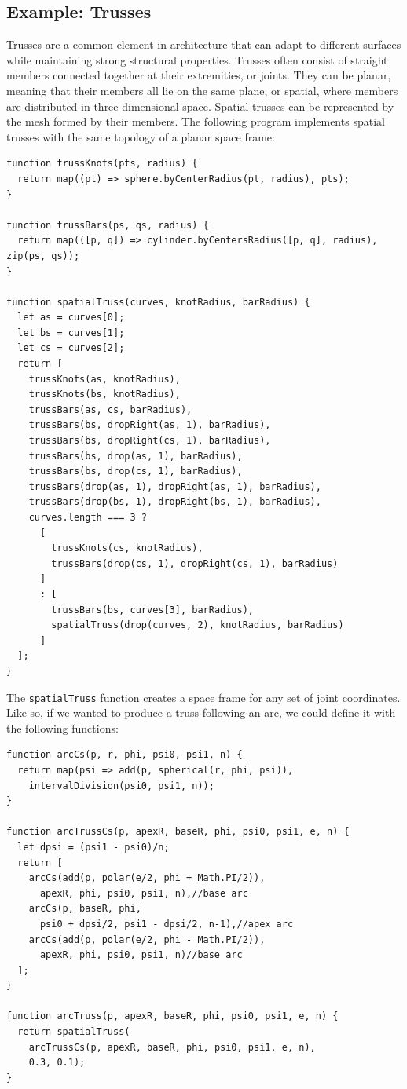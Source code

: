 \subsection{Example: Trusses}
Trusses are a common element in architecture that can adapt to different surfaces while maintaining strong structural properties.
Trusses often consist of straight members connected together at their extremities, or joints.
They can be planar, meaning that their members all lie on the same plane, or spatial, where members are distributed in three dimensional space.
Spatial trusses can be represented by the mesh formed by their members.
The following program implements spatial trusses with the same topology of a planar space frame:

\begin{verbatim}
function trussKnots(pts, radius) {
  return map((pt) => sphere.byCenterRadius(pt, radius), pts);
}

function trussBars(ps, qs, radius) {
  return map(([p, q]) => cylinder.byCentersRadius([p, q], radius), zip(ps, qs));
}

function spatialTruss(curves, knotRadius, barRadius) {
  let as = curves[0];
  let bs = curves[1];
  let cs = curves[2];
  return [
    trussKnots(as, knotRadius),
    trussKnots(bs, knotRadius),
    trussBars(as, cs, barRadius),
    trussBars(bs, dropRight(as, 1), barRadius),
    trussBars(bs, dropRight(cs, 1), barRadius),
    trussBars(bs, drop(as, 1), barRadius),
    trussBars(bs, drop(cs, 1), barRadius),
    trussBars(drop(as, 1), dropRight(as, 1), barRadius),
    trussBars(drop(bs, 1), dropRight(bs, 1), barRadius),
    curves.length === 3 ?
      [
        trussKnots(cs, knotRadius),
        trussBars(drop(cs, 1), dropRight(cs, 1), barRadius)
      ]
      : [
        trussBars(bs, curves[3], barRadius),
        spatialTruss(drop(curves, 2), knotRadius, barRadius)
      ]
  ];
}
\end{verbatim}

The {\tt spatialTruss} function creates a space frame for any set of joint coordinates.
Like so, if we wanted to produce a truss following an arc, we could define it with the following functions:

\begin{verbatim}
function arcCs(p, r, phi, psi0, psi1, n) {
  return map(psi => add(p, spherical(r, phi, psi)),
    intervalDivision(psi0, psi1, n));
}

function arcTrussCs(p, apexR, baseR, phi, psi0, psi1, e, n) {
  let dpsi = (psi1 - psi0)/n;
  return [
    arcCs(add(p, polar(e/2, phi + Math.PI/2)),
      apexR, phi, psi0, psi1, n),//base arc
    arcCs(p, baseR, phi,
      psi0 + dpsi/2, psi1 - dpsi/2, n-1),//apex arc
    arcCs(add(p, polar(e/2, phi - Math.PI/2)),
      apexR, phi, psi0, psi1, n)//base arc
  ];
}

function arcTruss(p, apexR, baseR, phi, psi0, psi1, e, n) {
  return spatialTruss(
    arcTrussCs(p, apexR, baseR, phi, psi0, psi1, e, n),
    0.3, 0.1);
}
\end{verbatim}


